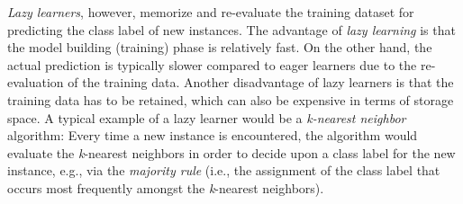 \documentclass{article}
\begin{document}
\emph{Lazy learners}, however, memorize and re-evaluate the training dataset for predicting the class label of new instances. The advantage of \emph{lazy learning} is that the model building (training) phase is relatively fast. On the other hand, the actual prediction is typically slower compared to eager learners due to the re-evaluation of the training data. Another disadvantage of lazy learners is that the training data has to be retained, which can also be expensive in terms of storage space. A typical example of a lazy learner would be a \emph{k-nearest neighbor} algorithm: Every time a new instance is encountered, the algorithm would evaluate the \emph{k}-nearest neighbors in order to decide upon a class label for the new instance, e.g., via the \emph{majority rule} (i.e., the assignment of the class label that occurs most frequently amongst the \emph{k}-nearest neighbors).


{}

\end{document}
